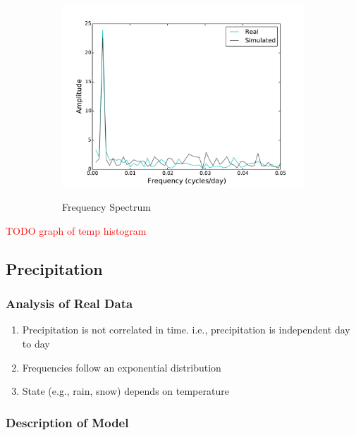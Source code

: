 \documentclass[11pt, letterpaper]{article}
\begin{document}
\begin{figure}[H]
  ~
  \begin{subfigure}[b]{0.45\textwidth}
    \includegraphics[width=\textwidth]{figures/sim_temp_fft.pdf}
    \label{fig:analysis-ft}
    \caption{Frequency Spectrum}
  \end{subfigure}
  
  \label{fig:analysis}
  \caption{}
\end{figure}

\textcolor{red}{TODO graph of temp histogram}

\subsection{Precipitation}

\subsubsection{Analysis of Real Data}

\begin{enumerate}
\item Precipitation is not correlated in time.  i.e., precipitation is independent day to day
\item Frequencies follow an exponential distribution
\item State (e.g., rain, snow) depends on temperature
\end{enumerate}

\subsubsection{Description of Model}
\end{document}
